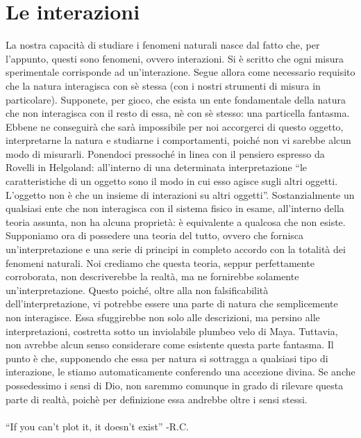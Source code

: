 \documentclass[]{article}
\begin{document}
	\section{Le interazioni}
	La nostra capacità di studiare i fenomeni naturali nasce dal fatto che, per l'appunto, questi sono fenomeni, ovvero interazioni. Si è scritto che ogni misura sperimentale corrisponde ad un'interazione. Segue allora come necessario requisito che la natura interagisca con sè stessa (con i nostri strumenti di misura in particolare). Supponete, per gioco, che esista un ente fondamentale della natura che non interagisca con il resto di essa, nè con sè stesso: una particella fantasma. Ebbene ne conseguirà che sarà impossibile per noi accorgerci di questo oggetto, interpretarne la natura e studiarne i comportamenti, poiché non vi sarebbe alcun modo di misurarli. Ponendoci pressoché in linea con il pensiero espresso da Rovelli in Helgoland: all'interno di una determinata interpretazione \enquote{le caratteristiche di un oggetto sono il modo in cui esso agisce sugli altri oggetti. L'oggetto non è che un insieme di interazioni su altri oggetti}. Sostanzialmente un qualsiasi ente che non interagisca con il sistema fisico in esame, all'interno della teoria assunta, non ha alcuna proprietà: è equivalente a qualcosa che non esiste. \\
	Supponiamo ora di possedere una teoria del tutto, ovvero che fornisca un'interpretazione e una serie di principi in completo accordo con la totalità dei fenomeni naturali. Noi crediamo che questa teoria, seppur perfettamente corroborata, non descriverebbe la realtà, ma ne fornirebbe solamente un'interpretazione. Questo poiché, oltre alla non falsificabilità dell'interpretazione, vi potrebbe essere una parte di natura che semplicemente non interagisce. Essa sfuggirebbe non solo alle descrizioni, ma persino alle interpretazioni, costretta sotto un inviolabile plumbeo velo di Maya. Tuttavia, non avrebbe alcun senso considerare come esistente questa parte fantasma. Il punto è che, supponendo che essa per natura si sottragga a qualsiasi tipo di interazione, le stiamo automaticamente conferendo una accezione divina. Se anche possedessimo i sensi di Dio, non saremmo comunque in grado di rilevare questa parte di realtà, poichè per definizione essa andrebbe oltre i sensi stessi.\\
	\\
	\enquote{If you can't plot it, it doesn't exist} -R.C.
\end{document}
